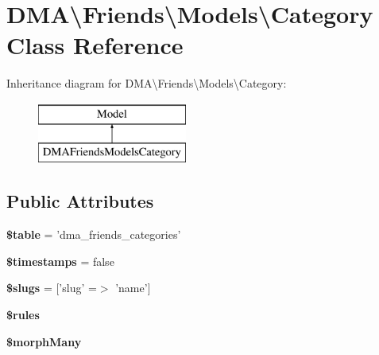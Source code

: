 \hypertarget{classDMA_1_1Friends_1_1Models_1_1Category}{\section{D\+M\+A\textbackslash{}Friends\textbackslash{}Models\textbackslash{}Category Class Reference}
\label{classDMA_1_1Friends_1_1Models_1_1Category}
}
Inheritance diagram for D\+M\+A\textbackslash{}Friends\textbackslash{}Models\textbackslash{}Category\+:\begin{figure}[H]
\begin{center}
\leavevmode
\includegraphics[height=2.000000cm]{de/d78/classDMA_1_1Friends_1_1Models_1_1Category}
\end{center}
\end{figure}
\subsection*{Public Attributes}
\begin{DoxyCompactItemize}
\item 
\hypertarget{classDMA_1_1Friends_1_1Models_1_1Category_a07d3500cfe462a4db9703ae093158cad}{{\bfseries \$table} = 'dma\+\_\+friends\+\_\+categories'}\label{classDMA_1_1Friends_1_1Models_1_1Category_a07d3500cfe462a4db9703ae093158cad}

\item 
\hypertarget{classDMA_1_1Friends_1_1Models_1_1Category_a2f7a923f3b13a157cc81e2333977584f}{{\bfseries \$timestamps} = false}\label{classDMA_1_1Friends_1_1Models_1_1Category_a2f7a923f3b13a157cc81e2333977584f}

\item 
\hypertarget{classDMA_1_1Friends_1_1Models_1_1Category_a18557e5621449f9dd6789a00fabacc9c}{{\bfseries \$slugs} = \mbox{[}'slug' =$>$ 'name'\mbox{]}}\label{classDMA_1_1Friends_1_1Models_1_1Category_a18557e5621449f9dd6789a00fabacc9c}

\item 
{\bfseries \$rules}
\item 
{\bfseries \$morph\+Many}
\end{DoxyCompactItemize}
